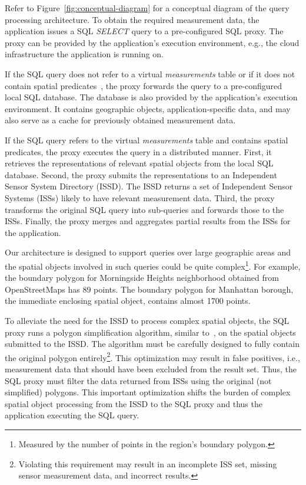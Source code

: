 \documentclass[conference,10pt]{IEEEtran}
\begin{document}
Refer to Figure~\ref{fig:conceptual-diagram} for a conceptual diagram of the query processing architecture. To obtain the required measurement data, the application issues a SQL \textit{SELECT} query to a pre-configured SQL proxy. The proxy can be provided by the application's execution environment, e.g., the cloud infrastructure the application is running on.

If the SQL query does not refer to a virtual \textit{measurements} table or if it does not contain spatial predicates~\cite{sql-spatial,simple-feature-access}, the proxy forwards the query to a pre-configured local SQL database. The database is also provided by the application's execution environment. It contains geographic objects, application-specific data, and may also serve as a cache for previously obtained measurement data.

If the SQL query refers to the virtual \textit{measurements} table and contains spatial predicates, the proxy executes the query in a distributed manner. First, it retrieves the representations of relevant spatial objects from the local SQL database. Second, the proxy submits the representations to an Independent Sensor System Directory (ISSD). The ISSD returns a set of Independent Sensor Systems (ISSs) likely to have relevant measurement data. Third, the proxy transforms the original SQL query into sub-queries and forwards those to the ISSs. Finally, the proxy merges and aggregates partial results from the ISSs for the application.

Our architecture is designed to support queries over large geographic areas and the spatial objects involved in such queries could be quite complex\footnote{Measured by the number of points in the region's boundary polygon.}. For example, the boundary polygon for Morningside Heights neighborhood obtained from OpenStreetMaps has 89 points. The boundary polygon for Manhattan borough, the immediate enclosing spatial object, contains almost 1700 points.

To alleviate the need for the ISSD to process complex spatial objects, the SQL proxy runs a polygon simplification algorithm, similar to~\cite{song2011polygon}, on the spatial objects submitted to the ISSD. The algorithm must be carefully designed to fully contain the original polygon entirely\footnote{Violating this requirement may result in an incomplete ISS set, missing sensor measurement data, and incorrect results.}. This optimization may result in false positives, i.e., measurement data that should have been excluded from the result set. Thus, the SQL proxy must filter the data returned from ISSs using the original (not simplified) polygons. This important optimization shifts the burden of complex spatial object processing from the ISSD to the SQL proxy and thus the application executing the SQL query.
\end{document}
